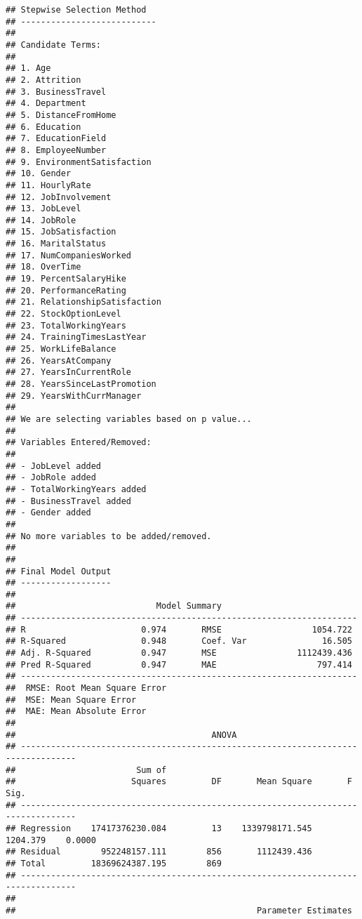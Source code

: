 \documentclass[]{article}
\begin{document}
\begin{verbatim}
## Stepwise Selection Method   
## ---------------------------
## 
## Candidate Terms: 
## 
## 1. Age 
## 2. Attrition 
## 3. BusinessTravel 
## 4. Department 
## 5. DistanceFromHome 
## 6. Education 
## 7. EducationField 
## 8. EmployeeNumber 
## 9. EnvironmentSatisfaction 
## 10. Gender 
## 11. HourlyRate 
## 12. JobInvolvement 
## 13. JobLevel 
## 14. JobRole 
## 15. JobSatisfaction 
## 16. MaritalStatus 
## 17. NumCompaniesWorked 
## 18. OverTime 
## 19. PercentSalaryHike 
## 20. PerformanceRating 
## 21. RelationshipSatisfaction 
## 22. StockOptionLevel 
## 23. TotalWorkingYears 
## 24. TrainingTimesLastYear 
## 25. WorkLifeBalance 
## 26. YearsAtCompany 
## 27. YearsInCurrentRole 
## 28. YearsSinceLastPromotion 
## 29. YearsWithCurrManager 
## 
## We are selecting variables based on p value...
## 
## Variables Entered/Removed: 
## 
## - JobLevel added 
## - JobRole added 
## - TotalWorkingYears added 
## - BusinessTravel added 
## - Gender added 
## 
## No more variables to be added/removed.
## 
## 
## Final Model Output 
## ------------------
## 
##                            Model Summary                            
## -------------------------------------------------------------------
## R                       0.974       RMSE                  1054.722 
## R-Squared               0.948       Coef. Var               16.505 
## Adj. R-Squared          0.947       MSE                1112439.436 
## Pred R-Squared          0.947       MAE                    797.414 
## -------------------------------------------------------------------
##  RMSE: Root Mean Square Error 
##  MSE: Mean Square Error 
##  MAE: Mean Absolute Error 
## 
##                                       ANOVA                                       
## ---------------------------------------------------------------------------------
##                        Sum of                                                    
##                       Squares         DF       Mean Square       F          Sig. 
## ---------------------------------------------------------------------------------
## Regression    17417376230.084         13    1339798171.545    1204.379    0.0000 
## Residual        952248157.111        856       1112439.436                       
## Total         18369624387.195        869                                         
## ---------------------------------------------------------------------------------
## 
##                                                Parameter Estimates                                                 

\end{verbatim}
\end{document}
